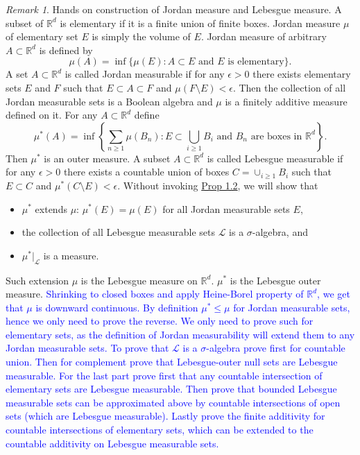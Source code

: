 \documentclass[hidelinks,11pt]{article}
\theoremstyle{definition}
\theoremstyle{dotless}
\theoremstyle{remark}
\newtheorem*{remark}{Remark}
\DeclareMathOperator{\1}{\mathbf{1}}
\begin{document}
\begin{remark}
Hands on construction of Jordan measure and Lebesgue measure.\smallbreak
A subset of $\mathbb{R}^d$ is elementary if it is a finite union of finite boxes. Jordan measure $\mu$ of elementary set $E$ is simply the volume of $E$. Jordan measure of arbitrary $A\subset\mathbb{R}^d$ is defined by
\[\mu(A)=\inf\{\mu(E):A\subset E\textrm{ and }E\textrm{ is elementary}\}.\]
A set $A\subset\mathbb{R}^d$ is called Jordan measurable if for any $\epsilon>0$ there exists elementary sets $E$ and $F$ such that $E\subset A\subset F$ and $\mu(F\setminus E)<\epsilon$. Then the collection of all Jordan measurable sets is a Boolean algebra and $\mu$ is a finitely additive measure defined on it.\medbreak
For any $A\subset\mathbb{R}^d$ define
\[\mu^\ast(A)=\inf\left\{\sum_{n\geq1}\mu(B_n):E\subset\bigcup_{i\geq1}B_i\textrm{ and }B_n\textrm{ are boxes in }\mathbb{R}^d\right\}.\]
Then $\mu^\ast$ is an outer measure. A subset $A\subset\mathbb{R}^d$ is called Lebesgue measurable if for any $\epsilon>0$ there exists a countable union of boxes $C=\cup_{i\geq1}B_i$ such that $E\subset C$ and $\mu^\ast(C\setminus E)<\epsilon$. Without invoking \hyperref[Prop 1.1]{Prop 1.2}, we will show that\begin{itemize}
    \item $\mu^*$ extends $\mu$: $\mu^\ast(E)=\mu(E)$ for all Jordan measurable sets $E$,
    \item the collection of all Lebesgue measurable sets $\mathcal{L}$ is a $\sigma$-algebra, and
    \item $\mu^\ast|_\mathcal{L}$ is a measure.
\end{itemize}
Such extension $\mu$ is the Lebesgue measure on $\mathbb{R}^d$. $\mu^\ast$ is the Lebesgue outer measure.\smallbreak
\textcolor{blue}{Shrinking to closed boxes and apply Heine-Borel property of $\mathbb{R}^d$, we get that $\mu$ is downward continuous.\smallbreak
By definition $\mu^*\leq\mu$ for Jordan measurable sets, hence we only need to prove the reverse. We only need to prove such for elementary sets, as the definition of Jordan measurability will extend them to any Jordan measurable sets.\smallbreak
To prove that $\mathcal{L}$ is a $\sigma$-algebra prove first for countable union. Then for complement prove that Lebesgue-outer null sets are Lebesgue measurable.\smallbreak
For the last part prove first that any countable intersection of elementary sets are Lebesgue measurable. Then prove that bounded Lebesgue measurable sets can be approximated above by countable intersections of open sets (which are Lebesgue measurable). Lastly prove the finite additivity for countable intersections of elementary sets, which can be extended to the countable additivity on Lebesgue measurable sets.}
\end{remark}
\end{document}
